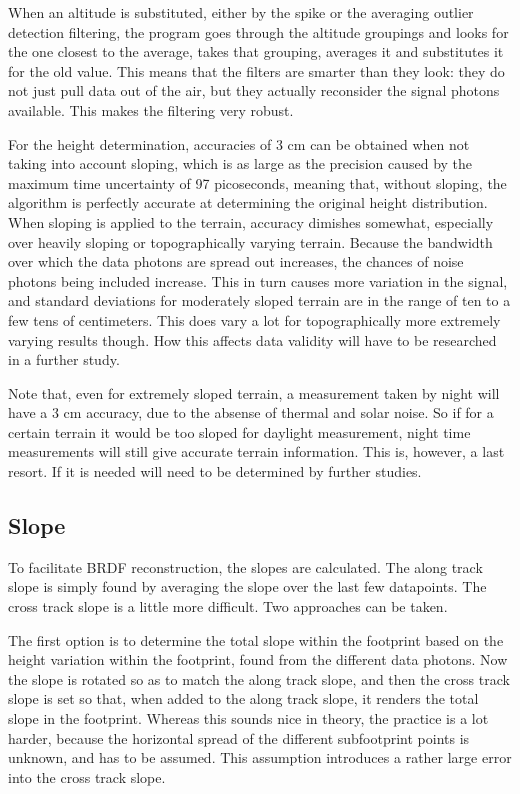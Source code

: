 When an altitude is substituted, either by the spike or the averaging outlier detection filtering, the program goes through the altitude groupings and looks for the one closest to the average, takes that grouping, averages it and substitutes it for the old value. This means that the filters are smarter than they look: they do not just pull data out of the air, but they actually reconsider the signal photons available. This makes the filtering very robust.

For the height determination, accuracies of 3 cm can be obtained when not taking into account sloping, which is as large as the precision caused by the maximum time uncertainty of 97 picoseconds, meaning that, without sloping, the algorithm is perfectly accurate at determining the original height distribution. When sloping is applied to the terrain, accuracy dimishes somewhat, especially over heavily sloping or topographically varying terrain. Because the bandwidth over which the data photons are spread out increases, the chances of noise photons being included increase. This in turn causes more variation in the signal, and standard deviations for moderately sloped terrain are in the range of ten to a few tens of centimeters. This does vary a lot for topographically more extremely varying results though. How this affects data validity will have to be researched in a further study.

Note that, even for extremely sloped terrain, a measurement taken by night will have a 3 cm accuracy, due to the absense of thermal and solar noise. So if for a certain terrain it would be too sloped for daylight measurement, night time measurements will still give accurate terrain information. This is, however, a last resort. If it is needed will need to be determined by further studies.

\subsection{Slope}
\label{sec:Slope}
To facilitate \ac{BRDF} reconstruction, the slopes are calculated. The along track slope is simply found by averaging the slope over the last few datapoints. The cross track slope is a little more difficult. Two approaches can be taken. 

The first option is to determine the total slope within the footprint based on the height variation within the footprint, found from the different data photons. Now the slope is rotated so as to match the along track slope, and then the cross track slope is set so that, when added to the along track slope, it renders the total slope in the footprint. Whereas this sounds nice in theory, the practice is a lot harder, because the horizontal spread of the different subfootprint points is unknown, and has to be assumed. This assumption introduces a rather large error into the cross track slope.

